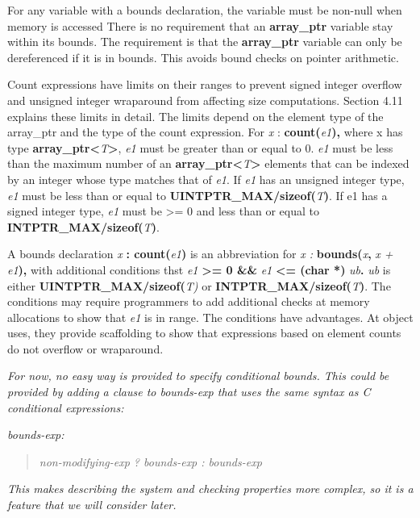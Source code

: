 \documentclass[]{article}
\begin{document}
For any variable with a bounds declaration, the variable must be
non-null when memory is accessed There is no requirement that an
\textbf{array\_ptr} variable stay within its bounds. The requirement is
that the \textbf{array\_ptr} variable can only be dereferenced if it is
in bounds. This avoids bound checks on pointer arithmetic.

Count expressions have limits on their ranges to prevent signed integer
overflow and unsigned integer wraparound from affecting size
computations. Section 4.11 explains these limits in detail. The limits
depend on the element type of the array\_ptr and the type of the count
expression. For \emph{x} : \textbf{count(}\emph{e1}\textbf{),} where x
has type \textbf{array\_ptr\textless{}}\emph{T}\textbf{\textgreater{}},
\emph{e1} must be greater than or equal to 0. \emph{e1} must be less
than the maximum number of an
\textbf{array\_ptr\textless{}}\emph{T}\textbf{\textgreater{}} elements
that can be indexed by an integer whose type matches that of \emph{e1}.
If \emph{e1} has an unsigned integer type, \emph{e1} must be less than
or equal to \textbf{UINTPTR\_MAX/sizeof(}\emph{T}\textbf{)}. If e1 has a
signed integer type, \emph{e1} must be \textgreater{}= 0 and less than
or equal to \textbf{INTPTR\_MAX/sizeof(}\emph{T}\textbf{)}.

A bounds declaration \emph{x} \textbf{: count(}\emph{e1}\textbf{)} is an
abbreviation for \emph{x :} \textbf{bounds(}\emph{x}\textbf{,} \emph{x +
e1}\textbf{),} with additional conditions thst \emph{e1}
\textbf{\textgreater{}= 0 \&\&} \emph{e1} \textbf{\textless{}= (char *)}
\emph{ub}\textbf{.} \emph{ub} is either
\textbf{UINTPTR\_MAX/sizeof(}\emph{T)} or
\textbf{INTPTR\_MAX/sizeof(}\emph{T}\textbf{)}. The conditions may
require programmers to add additional checks at memory allocations to
show that \emph{e1} is in range. The conditions have advantages. At
object uses, they provide scaffolding to show that expressions based on
element counts do not overflow or wraparound.

\emph{For now, no easy way is provided to specify conditional bounds.
This could be provided by adding a clause to bounds-exp that uses the
same syntax as C conditional expressions: }

\emph{bounds-exp: }

\begin{quote}
\emph{non-modifying-exp ? bounds-exp : bounds-exp}
\end{quote}

\emph{This makes describing the system and checking properties more
complex, so it is a feature that we will consider later.}
\end{document}
